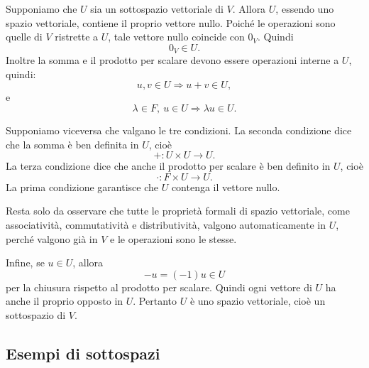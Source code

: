 \documentclass[a4paper]{article}
\begin{document}
\begin{snippetproof}{}
    \begin{iffproof}
    \item Supponiamo che \(U\) sia un sottospazio vettoriale di \(V\). Allora \(U\), essendo uno spazio vettoriale, contiene il proprio vettore nullo. Poiché le operazioni sono quelle di \(V\) ristrette a \(U\), tale vettore nullo coincide con \(0_V\). Quindi
        \[
            0_V\in U.
        \]
        Inoltre la somma e il prodotto per scalare devono essere operazioni interne a \(U\), quindi:
        \[
            u,v\in U \Longrightarrow u+v\in U,
        \]
        e
        \[
            \lambda\in F,\ u\in U \Longrightarrow \lambda u\in U.
        \]

    \item Supponiamo viceversa che valgano le tre condizioni. La seconda condizione dice che la somma è ben definita in \(U\), cioè
        \[
            + : U\times U\to U.
        \]
        La terza condizione dice che anche il prodotto per scalare è ben definito in \(U\), cioè
        \[
            \cdot : F\times U\to U.
        \]
        La prima condizione garantisce che \(U\) contenga il vettore nullo.

        Resta solo da osservare che tutte le proprietà formali di spazio vettoriale, come associatività, commutatività e distributività, valgono automaticamente in \(U\), perché valgono già in \(V\) e le operazioni sono le stesse.

        Infine, se \(u\in U\), allora
        \[
            -u=(-1)u\in U
        \]
        per la chiusura rispetto al prodotto per scalare. Quindi ogni vettore di \(U\) ha anche il proprio opposto in \(U\). Pertanto \(U\) è uno spazio vettoriale, cioè un sottospazio di \(V\).
    \end{iffproof}
\end{snippetproof}

\subsection{Esempi di sottospazi}
\end{document}
